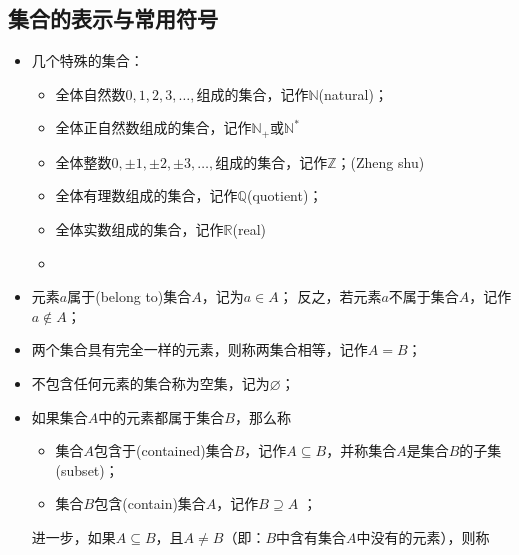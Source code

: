   \subsection{集合的表示与常用符号}
    \begin{itemize}
      \item 几个特殊的集合：
        \begin{itemize}
          \item 全体{\fangsong 自然数}$0,1,2,3,\ldots ,$组成的集合，记作$\mathbb{N}$(natural)；
          \item 全体正自然数组成的集合，记作$\mathbb{N}_+$或$\mathbb{N}^*$
          \item 全体{\fangsong 整数}$0,\pm1,\pm2,\pm3,\ldots ,$组成的集合，记作$\mathbb{Z}$；(Zheng shu)
          \item 全体{\fangsong 有理数}组成的集合，记作$\mathbb{Q}$(quotient)；
          \item 全体{\fangsong 实数}组成的集合，记作$\mathbb{R}$(real)
          \item {}
        \end{itemize}
      \item 元素$a${\fangsong 属于}(belong to)集合$A$，记为$a\in A$；
        反之，若元素$a${\fangsong 不属于}集合$A$，记作$a\notin A$；
        \\
      \item 两个集合具有完全一样的元素，则称两集合{\fangsong 相等}，记作$A=B$；
        \\
      \item 不包含任何元素的集合称为{\fangsong 空集}，记为$\varnothing$；
        \\
      \item 如果集合$A$中的元素都属于集合$B$，那么称
        \begin{itemize}
          \item 集合$A${\fangsong 包含于}(contained)集合$B$，记作$A\subseteq B$，并称集合$A$是集合$B$的{\fangsong 子集}(subset)；
          \item 集合$B${\fangsong 包含}(contain)集合$A$，记作$B\supseteq A$ ；
        \end{itemize}
        进一步，如果$A\subseteq B$，且$A\neq B$（即：$B$中含有集合$A$中没有的元素），则称
          \begin{itemize}

\end{itemize}
\end{itemize}
